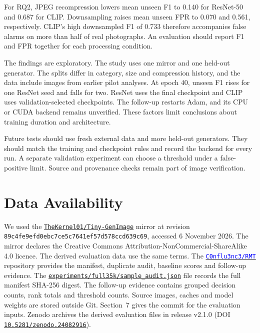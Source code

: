 \documentclass[11pt,a4paper]{article}
\newcommand{\repositorylink}{\href{https://github.com/C0nflu3nc3/RMT}{\mbox{\textcolor{blue}{\texttt{C0nflu3nc3/RMT}}}}}
\begin{document}
For RQ2, JPEG recompression lowers mean unseen F1 to 0.140 for ResNet-50 and 0.687 for CLIP. Downsampling raises mean unseen FPR to 0.070 and 0.561, respectively. CLIP's high downsampled F1 of 0.733 therefore accompanies false alarms on more than half of real photographs. An evaluation should report F1 and FPR together for each processing condition.

The findings are exploratory. The study uses one mirror and one held-out generator. The splits differ in category, size and compression history, and the data include images from earlier pilot analyses. At epoch 40, unseen F1 rises for one ResNet seed and falls for two. ResNet uses the final checkpoint and CLIP uses validation-selected checkpoints. The follow-up restarts Adam, and its CPU or CUDA backend remains unverified. These factors limit conclusions about training duration and architecture.

Future tests should use fresh external data and more held-out generators. They should match the training and checkpoint rules and record the backend for every run. A separate validation experiment can choose a threshold under a false-positive limit. Source and provenance checks remain part of image verification.

\section{Data Availability}
We used the \href{https://huggingface.co/datasets/TheKernel01/Tiny-GenImage/tree/89c4fe9efd0ebc7ce5c7641ef57d578ccd639c69}{\nolinkurl{TheKernel01/Tiny-GenImage}} mirror at revision \nolinkurl{89c4fe9efd0ebc7ce5c7641ef57d578ccd639c69}, accessed 6 November 2026. The mirror declares the Creative Commons Attribution-NonCommercial-ShareAlike 4.0 licence. The derived evaluation data use the same terms. The \repositorylink{} repository provides the manifest, duplicate audit, baseline scores and follow-up evidence. The \href{https://github.com/C0nflu3nc3/RMT/blob/f107c2a3a5f70342654308baccb572bf04f454ed/experiments/full35k/sample_audit.json}{\nolinkurl{experiments/full35k/sample_audit.json}} file records the full manifest SHA-256 digest. The follow-up evidence contains grouped decision counts, rank totals and threshold counts. Source images, caches and model weights are stored outside Git. Section~7 gives the commit for the evaluation inputs. Zenodo archives the derived evaluation files in release v2.1.0 (DOI \href{https://doi.org/10.5281/zenodo.24082916}{\nolinkurl{10.5281/zenodo.24082916}}).
\end{document}
